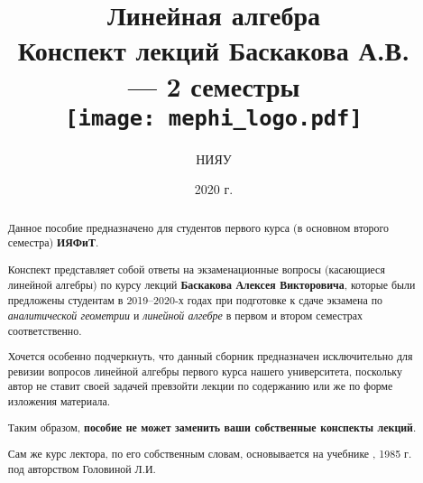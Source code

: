 \documentclass[12pt, a4paper]{report}
\begin{document}
	\title{
		\centering \vfill
		\vspace*{0.5cm}
		\textbf{\huge Линейная алгебра} \\\bigskip
		\large Конспект лекций Баскакова А.В.\\ --- 2 семестры\\
		\vspace*{2.5cm}
		\texttt{[image: mephi\_logo.pdf]}\vfill
	}
	\author{НИЯУ }
	\date{2020 г.}
	
	\maketitle
	
	\begin{abstract}
		
		Данное пособие предназначено для студентов первого курса (в основном второго семестра) \textbf{ИЯФиТ}.
		
		Конспект представляет собой ответы на экзаменационные вопросы (касающиеся линейной алгебры) по курсу лекций \textbf{Баскакова Алексея Викторовича}, которые были предложены студентам в 2019--2020-х годах при подготовке к сдаче экзамена по \textit{аналитической геометрии} и \textit{линейной алгебре} в первом и втором семестрах соответственно.
		
		Хочется особенно подчеркнуть, что данный сборник предназначен исключительно для ревизии вопросов линейной алгебры первого курса нашего университета, поскольку автор не ставит своей задачей превзойти лекции по содержанию или же по форме изложения материала.
		
		Таким образом, \textbf{пособие не может заменить ваши собственные конспекты лекций}.
		
		Сам же курс лектора, по его собственным словам, основывается на учебнике , 1985 г. под авторством Головиной Л.И.
	\end{abstract}
\end{document}
